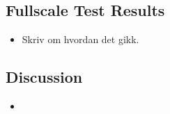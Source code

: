 \subsection{Fullscale Test Results}
\begin{itemize}
    \item Skriv om hvordan det gikk.
\end{itemize}

\subsection{Discussion}
\begin{itemize}
    \item 
\end{itemize}

\newpage